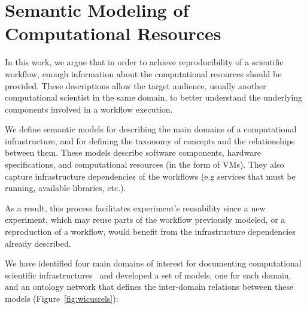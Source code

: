 \section{Semantic Modeling of Computational Resources}
\label{sec:semantic}





In this work, we argue that in order to achieve reproducibility of a scientific workflow, enough information 
about the computational resources should be provided. These descriptions allow the target audience, 
usually another computational scientist in the same domain, to better understand the underlying 
components involved in a workflow execution.


We define semantic models for describing the main domains of a 
computational infrastructure, and for defining the taxonomy of concepts and the relationships 
between them. These models describe software components, hardware specifications, 
and computational resources (in the form of VMs). They also capture infrastructure 
dependencies of the workflows (e.g services that must be running, available libraries, etc.).
 
 As a result, this process facilitates experiment's reusability since 
a new experiment, which may reuse parts of the workflow previously modeled, or a reproduction 
of a workflow, would benefit from the infrastructure dependencies already described.

We have identified four main domains of interest for documenting computational scientific 
infrastructures~\cite{wicus} and developed a set of models, one for each domain, 
and an ontology network that defines the inter-domain relations between these models 
(Figure~\ref{fig:wicusrels}):

